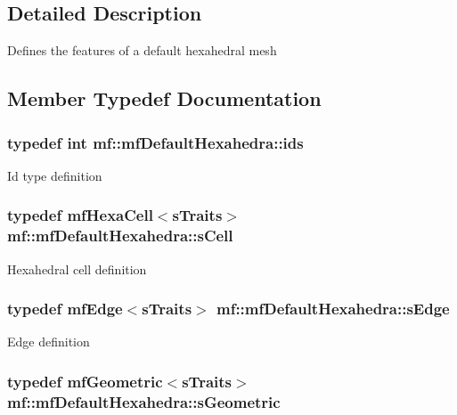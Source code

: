 \subsection{Detailed Description}
Defines the features of a default hexahedral mesh 

\subsection{Member Typedef Documentation}
\hypertarget{structmf_1_1mfDefaultHexahedra_a57a742de88b24adcba862c9333d2164a}{
\subsubsection[{ids}]{\setlength{\rightskip}{0pt plus 5cm}typedef int {\bf mf::mfDefaultHexahedra::ids}}}
\label{structmf_1_1mfDefaultHexahedra_a57a742de88b24adcba862c9333d2164a}
Id type definition \hypertarget{structmf_1_1mfDefaultHexahedra_a8ec40ad2dedf7b88583df8f40007382e}{
\subsubsection[{sCell}]{\setlength{\rightskip}{0pt plus 5cm}typedef {\bf mfHexaCell}$<${\bf sTraits}$>$ {\bf mf::mfDefaultHexahedra::sCell}}}
\label{structmf_1_1mfDefaultHexahedra_a8ec40ad2dedf7b88583df8f40007382e}
Hexahedral cell definition \hypertarget{structmf_1_1mfDefaultHexahedra_a344dd6b466e412c06a16151b4e366c04}{
\subsubsection[{sEdge}]{\setlength{\rightskip}{0pt plus 5cm}typedef {\bf mfEdge}$<${\bf sTraits}$>$ {\bf mf::mfDefaultHexahedra::sEdge}}}
\label{structmf_1_1mfDefaultHexahedra_a344dd6b466e412c06a16151b4e366c04}
Edge definition \hypertarget{structmf_1_1mfDefaultHexahedra_a53ee4c731be21fc32670a7c8959febe5}{
\subsubsection[{sGeometric}]{\setlength{\rightskip}{0pt plus 5cm}typedef {\bf mfGeometric}$<${\bf sTraits}$>$ {\bf mf::mfDefaultHexahedra::sGeometric}}}
